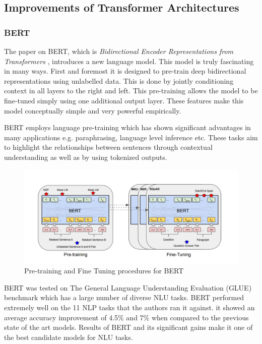 \documentclass[a4paper,12pt]{report}
\begin{document}
		\subsection{Improvements of Transformer Architectures}\label{232}

		\subsubsection{BERT}\label{2321}

			The paper on BERT, which is \textit{Bidirectional Encoder Representations from Transformers} \citep{bert}, introduces a new language model. This model is truly fascinating in many ways. First and foremost it is designed to pre-train deep bidirectional representations using unlabelled data. This is done by jointly conditioning context in all layers to the right and left. This pre-training allows the model to be fine-tuned simply using one additional output layer. These features make this model conceptually simple and very powerful empirically.

			BERT employs language pre-training \citep{dai} which has shown significant advantages in many applications e.g. paraphrasing, language level inference etc. These tasks aim to highlight the relationships between sentences through contextual understanding as well as by using tokenized outputs.
			\begin{figure}[h!]
				\centering
				\includegraphics[scale=0.35]{../images/BERT.png}
				\caption{Pre-training and Fine Tuning procedures for BERT \citep{bert}}\label{bertPretraining}
			\end{figure}

			BERT was tested on The General Language Understanding Evaluation (GLUE) benchmark \citep{wang} which has a large number of diverse NLU tasks.
			BERT performed extremely well on the 11 NLP tasks that the authors ran it against. it showed an average accuracy improvement of 4.5\% and 7\% when compared to the previous state of the art models. Results of BERT and its significant gains make it one of the best candidate models for NLU tasks.
\end{document}

